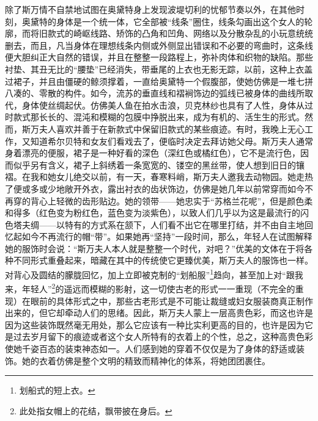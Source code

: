 \par 除了斯万情不自禁地试图在奥黛特身上发现波堤切利的忧郁节奏以外，在其他时刻，奥黛特的身体是一个统一体，它全部被“线条”圈住，线条勾画出这个女人的轮廓，而将旧款式的崎岖线路、矫饰的凸角和凹角、网络以及分散杂乱的小玩意统统删去，而且，凡当身体在理想线条内侧或外侧显出错误和不必要的弯曲时，这条线便大胆纠正大自然的错误，并且在整整一段路程上，弥补肉体和织物的缺陷。那些衬垫、其丑无比的“腰垫”已经消失，带垂尾的上衣也无影无踪，以前，这种上衣盖过裙子，并且由僵硬的鲸须撑着，一直给奥黛特一个假腹部，使她仿佛是一堆七拼八凑的、零散的构件。如今，流苏的垂直线和褶裥饰边的弧线已被身体的曲线所取代，身体使丝绸起伏。仿佛美人鱼在拍水击浪，贝克林纱也具有了人性，身体从过时款式那长长的、混沌和模糊的包膜中挣脱出来，成为有机的、活生生的形式。然而，斯万夫人喜欢并善于在新款式中保留旧款式的某些痕迹。有时，我晚上无心工作，又知道希尔贝特和女友们看戏去了，便临时决定去拜访她父母。斯万夫人通常身着漂亮的便服，裙子是一种好看的深色（深红色或橘红色），它不是流行色，因而似乎另有含义，裙子上斜绣着一条宽宽的、镂空的黑丝带，使人想到旧日的镶褶。在我和她女儿绝交以前，有一天，春寒料峭，斯万夫人邀我去动物园。她走热了便或多或少地敞开外衣，露出衬衣的齿状饰边，仿佛是她几年以前常穿而如今不再穿的背心上轻微的齿形贴边。她的领带——她忠实于“苏格兰花呢”，但是颜色柔和得多（红色变为粉红色，蓝色变为淡紫色），以致人们几乎以为这是最流行的闪色塔夫绸——以特有的方式系在颔下，人们看不出它在哪里打结，并不由自主地回忆起如今不再流行的帽“带”。如果她再“坚持”一段时间，那么，年轻人在试图解释她的服饰时会说：“斯万夫人本人就是整整一个时代，对吧？”优美的文体在于将各种不同形式重叠起来，暗藏在其中的传统使它更臻优美，斯万夫人的服饰也一样。对背心及圆结的朦胧回忆，加上立即被克制的“划船服”\footnote{划船式的短上衣。}趋向，甚至加上对“跟我来，年轻人”\footnote{此处指女帽上的花结，飘带披在身后。}的遥远而模糊的影射，这一切使古老的形式一一重现（不完全的重现）在眼前的具体形式之中，那些古老形式是不可能让裁缝或妇女服装商真正制作出来的，但它却牵动人们的思绪。因此，斯万夫人蒙上一层高贵色彩，而这也许是因为这些装饰既然毫无用处，那么它应该有一种比实利更高的目的，也许是因为它是过去岁月留下的痕迹或者这个女人所特有的衣着上的个性，总之，这种高贵色彩使她千姿百态的装束神态如一。人们感到她的穿着不仅仅是为了身体的舒适或装饰。她的衣着仿佛是整个文明的精致而精神化的体系，将她团团裹住。
